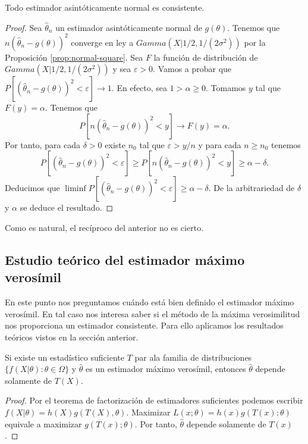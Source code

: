 \documentclass{article}
\begin{document}
    \begin{prop}
        Todo estimador asintóticamente normal es consistente.
    \end{prop}
    \begin{proof}
        Sea $\hat\theta_n$ un estimador asintóticamente normal de $g(\theta)$. Tenemos que $n (\hat\theta_n - g(\theta))^2$ converge en ley a $Gamma(X|1/2, 1/(2\sigma^2))$ por la Proposición \ref{prop:normal-square}. Sea $F$ la función de distribución de $Gamma(X|1/2, 1/(2\sigma^2))$ y sea $\varepsilon > 0$. Vamos a probar que $P[(\hat\theta_n - g(\theta))^2 < \varepsilon] \to 1$. En efecto, sea $1 > \alpha \ge 0$. Tomamos $y$ tal que $F(y) = \alpha$. Tenemos que
        \[P[n(\hat\theta_n - g(\theta))^2 < y] \to F(y) = \alpha.\]
        Por tanto, para cada $\delta > 0$ existe $n_0$ tal que $\varepsilon > y /n$ y para cada $n \ge n_0$ tenemos
        \[P[(\hat\theta_n - g(\theta))^2 < \varepsilon] \ge P[n(\hat\theta_n - g(\theta))^2 < y] \ge \alpha - \delta.\]
        Deducimos que $\liminf P[(\hat\theta_n - g(\theta))^2 < \varepsilon] \ge \alpha - \delta.$ De la arbitrariedad de $\delta$ y $\alpha$ se deduce el resultado.
    \end{proof}

    Como es natural, el recíproco del anterior no es cierto.

    \subsection{Estudio teórico del estimador máximo verosímil}

    En este punto nos preguntamos cuándo está bien definido el estimador máximo verosímil. En tal caso nos interesa saber si el método de la máxima verosimilitud nos proporciona un estimador consistente. Para ello aplicamos los resultados teóricos vistos en la sección anterior.

    \begin{prop}
        Si existe un estadístico suficiente $T$ par ala familia de distribuciones $\{f(X|\theta): \theta \in \Omega\}$ y $\hat\theta$ es un estimador máximo verosímil, entonces $\hat\theta$ depende solamente de $T(X)$.
    \end{prop}
    \begin{proof}
        Por el teorema de factorización de estimadores suficientes podemos escribir $f(X|\theta) = h(X) g(T(X), \theta)$. Maximizar $L(x; \theta) = h(x) g(T(x); \theta)$ equivale a maximizar $g(T(x); \theta)$. Por tanto, $\hat\theta$ depende solamente de $T(x)$.
    \end{proof}
\end{document}
